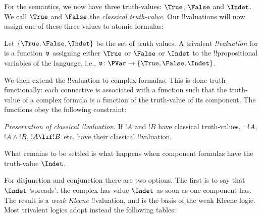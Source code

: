 \documentclass[../../../include/open-logic-section]{subfiles}
\begin{document}


For the semantics, we now have three truth-values: $\True$, $\False$ and $\Indet$. We call $\True$ and $\False$ the \emph{classical truth-value}. Our !!{valuation}s will now assign one of these three values to atomic formulas: 

\begin{defn} 
Let $\{\True, \False, \Indet \}$ be the set of truth values. A trivalent \emph{!!{valuation}} for is a function~$\pAssign{v}$ assigning either $\True$ or $\False$ or $\Indet$ to the
!!{propositional variable}s of the language, i.e., $\pAssign{v} \colon
\PVar \to \{\True, \False, \Indet \}$.
\end{defn}

We then extend the !!{valuation} to complex formulas. This is done truth-functionally: each connective is associated with a function such that the truth-value of a complex formula is a function of the truth-value of its component. The functions obey the following constraint:

\begin{prop}
  \item \emph{Preservation of classical !!{valuation}}. If $!A$ and $!B$ have classical truth-values, $\lnot !A$, $!A \land !B$, $!A \lif !B$ etc. have their classical !!{valuation}.
\end{prop}

What remains to be settled is what happens when component formulas have the truth-value $\Indet$.


For disjunction and conjunction there are two options. The first is to say that $\Indet$ `spreads': the complex has value $\Indet$ as soon as one component has. The result is a \emph{weak Kleene} !!{valuation}, and is the basis of the weak Kleene logic. Most trivalent logics adopt instead the following tables:
\end{document}
